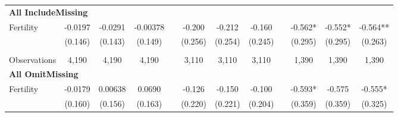 \begin{landscape}
\begin{table}[htpb!]
\begin{center}
\begin{tabular}{lcccp{2mm}cccp{2mm}ccc}
\multicolumn{12}{l}{\textbf{All IncludeMissing}}\\ 
Fertility&-0.0197&-0.0291&-0.00378&&-0.200&-0.212&-0.160&&-0.562*&-0.552*&-0.564**\\
&(0.146)&(0.143)&(0.149)&&(0.256)&(0.254)&(0.245)&&(0.295)&(0.295)&(0.263)\\
\begin{footnotesize}\end{footnotesize}&\begin{footnotesize}\end{footnotesize}&\begin{footnotesize}\end{footnotesize}&\begin{footnotesize}\end{footnotesize}&\begin{footnotesize}\end{footnotesize}&\begin{footnotesize}\end{footnotesize}&\begin{footnotesize}\end{footnotesize}&\begin{footnotesize}\end{footnotesize}&\begin{footnotesize}\end{footnotesize}&\begin{footnotesize}\end{footnotesize}&\begin{footnotesize}\end{footnotesize}&\begin{footnotesize}\end{footnotesize}\\Observations&4,190&4,190&4,190&&3,110&3,110&3,110&&1,390&1,390&1,390\\
\multicolumn{12}{l}{\textbf{All OmitMissing}}\\ 
Fertility&-0.0179&0.00638&0.0690&&-0.126&-0.150&-0.100&&-0.593*&-0.575&-0.555*\\
&(0.160)&(0.156)&(0.163)&&(0.220)&(0.221)&(0.204)&&(0.359)&(0.359)&(0.325)\\

\end{tabular}
\end{center}
\end{table}
\end{landscape}

